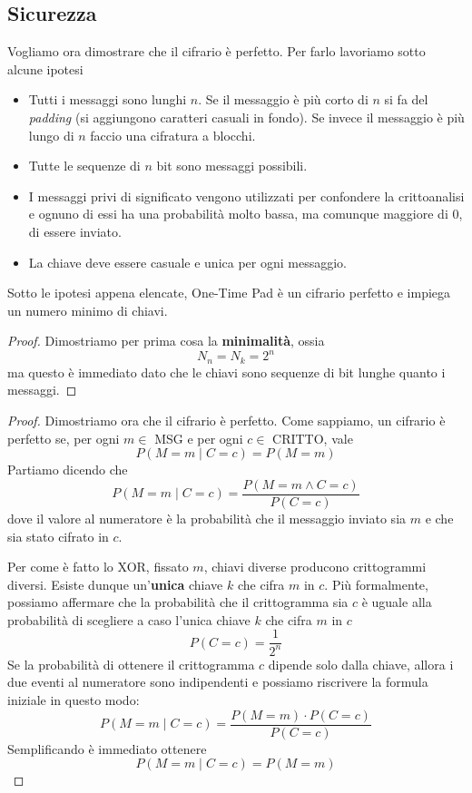 \subsection{Sicurezza}\label{sicurezza_otp}
Vogliamo ora dimostrare che il cifrario \`e perfetto. Per farlo lavoriamo sotto alcune ipotesi
\begin{itemize}
	\item Tutti i messaggi sono lunghi $n$. Se il messaggio \`e pi\`u corto di $n$ si fa del \emph{padding} (si
	      aggiungono caratteri casuali in fondo).
	      Se invece il messaggio \`e pi\`u lungo di $n$ faccio una cifratura a blocchi.
	\item Tutte le sequenze di $n$ bit sono messaggi possibili.
	\item I messaggi privi di significato vengono utilizzati per confondere la crittoanalisi e ognuno di essi ha una
	      probabilit\`a molto bassa, ma comunque maggiore di 0, di essere inviato.
	\item La chiave deve essere casuale e unica per ogni messaggio.
\end{itemize}

\begin{theorem}
	Sotto le ipotesi appena elencate, One-Time Pad \`e un cifrario perfetto e impiega un numero minimo di chiavi.
	\begin{proof}
		Dimostriamo per prima cosa la \textbf{minimalit\`a}, ossia
		\[ N_n = N_k = 2^n \]
		ma questo \`e immediato dato che le chiavi sono sequenze di bit lunghe quanto i messaggi.
	\end{proof}

	\begin{proof}
		Dimostriamo ora che il cifrario \`e perfetto. Come sappiamo, un cifrario \`e perfetto se, per ogni $m \in$ MSG
		e per ogni $c \in$ CRITTO, vale
		\[ P(M = m \mid C = c) = P(M = m) \]
		Partiamo dicendo che
		\[ P(M = m \mid C = c) = \frac{P(M = m \wedge C = c)}{P(C = c)} \]
		dove il valore al numeratore \`e la probabilit\`a che il messaggio inviato sia $m$ e che sia stato cifrato in
		$c$.

		Per come \`e fatto lo XOR, fissato $m$, chiavi diverse producono crittogrammi diversi. Esiste dunque
		un'\textbf{unica} chiave $k$ che cifra $m$ in $c$. Pi\`u formalmente, possiamo affermare che la probabilit\`a
		che il crittogramma sia $c$ \`e uguale alla probabilit\`a di scegliere a caso l'unica chiave $k$ che cifra $m$
		in $c$
		\[ P(C = c) = \frac{1}{2^n} \]
		Se la probabilit\`a di ottenere il crittogramma $c$ dipende solo dalla chiave, allora i due eventi al
		numeratore sono indipendenti e possiamo riscrivere la formula iniziale in questo modo:
		\[ P(M = m \mid C = c) = \frac{P(M = m) \cdot P(C = c)}{P(C = c)} \]
		Semplificando \`e immediato ottenere
		\[ P(M = m \mid C = c) = P(M = m) \]
	\end{proof}
\end{theorem}

